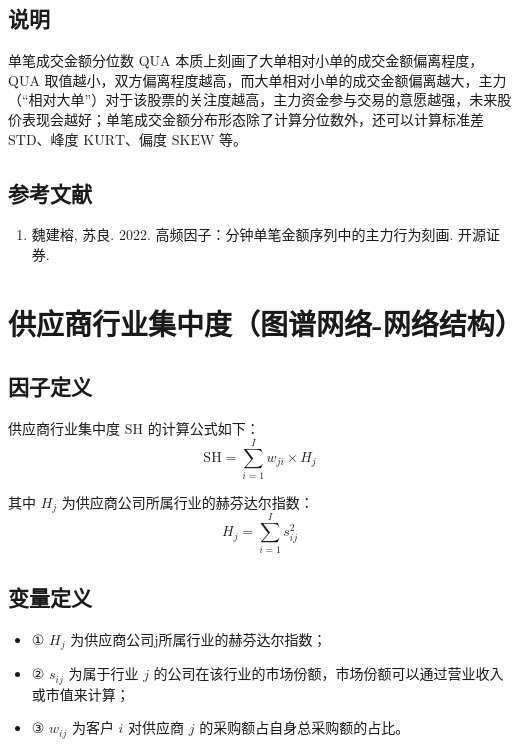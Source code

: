 \documentclass{article}
\begin{document}
\subsection{说明}
单笔成交金额分位数 \(\mathrm{QUA}\) 本质上刻画了大单相对小单的成交金额偏离程度，\(\mathrm{QUA}\) 取值越小，双方偏离程度越高，而大单相对小单的成交金额偏离越大，主力（“相对大单”）对于该股票的关注度越高，主力资金参与交易的意愿越强，未来股价表现会越好；单笔成交金额分布形态除了计算分位数外，还可以计算标准差 \(\mathrm{STD}\)、峰度 \(\mathrm{KURT}\)、偏度 \(\mathrm{SKEW}\) 等。

\subsection{参考文献}
\begin{enumerate}
    \item 魏建榕, 苏良. 2022. 高频因子：分钟单笔金额序列中的主力行为刻画. 开源证券.
\end{enumerate}

\section{供应商行业集中度（图谱网络-网络结构）}

\subsection{因子定义}


供应商行业集中度 \(\mathrm{SH}\) 的计算公式如下：
\begin{equation}
    \mathrm{SH} = \sum_{i=1}^{I} w_{ji} \times H_j
\end{equation}

其中 \(H_j\) 为供应商公司所属行业的赫芬达尔指数：
\begin{equation}
    H_j = \sum_{i=1}^{I} s_{ij}^2
\end{equation}

\subsection{变量定义}
\begin{itemize}
    \item ① \(H_j\) 为供应商公司j所属行业的赫芬达尔指数；
    \item ② \(s_{ij}\) 为属于行业 \(j\) 的公司在该行业的市场份额，市场份额可以通过营业收入或市值来计算；
    \item ③ \(w_{ij}\) 为客户 \(i\) 对供应商 \(j\) 的采购额占自身总采购额的占比。
\end{itemize}
\end{document}
